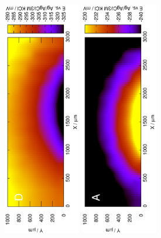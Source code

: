 \begin{figure}
\centering
\includegraphics[width=0.3\textwidth, angle=-90]{img/mérések/Fe_v.eps}
\includegraphics[width=0.3\textwidth, angle=-90]{img/mérések/Zn_v.eps}

\end{figure}
